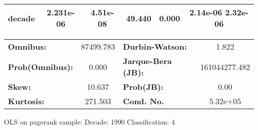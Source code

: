 \begin{center}
\begin{tabular}{lccccc}
\textbf{decade}             &    2.231e-06  &     4.51e-08     &    49.440  &         0.000        &      2.14e-06  2.32e-06       \\
\bottomrule
\end{tabular}
\begin{tabular}{lclc}
\textbf{Omnibus:}       & 87499.783 & \textbf{  Durbin-Watson:     } &       1.822    \\
\textbf{Prob(Omnibus):} &    0.000  & \textbf{  Jarque-Bera (JB):  } & 161044277.482  \\
\textbf{Skew:}          &   10.637  & \textbf{  Prob(JB):          } &        0.00    \\
\textbf{Kurtosis:}      &  271.503  & \textbf{  Cond. No.          } &    5.32e+05    \\
\bottomrule
\end{tabular}
\end{center}
\break
OLS on pagerank sample: Decade: 1990 Classification: 4
